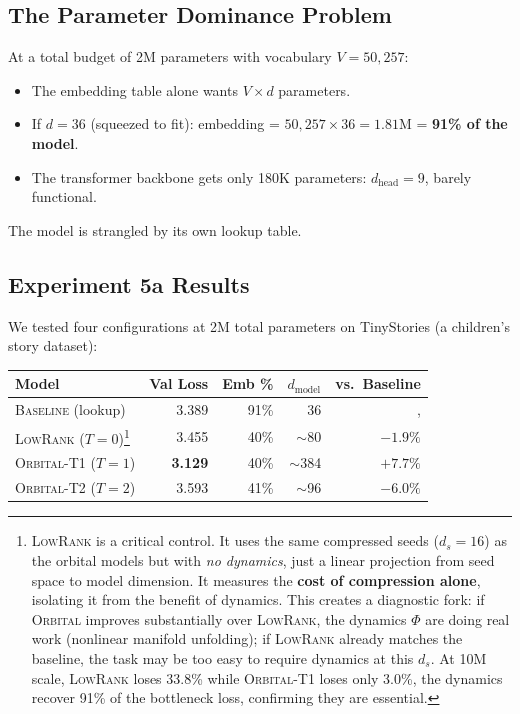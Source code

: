 \documentclass[11pt, a4paper]{article}
\theoremstyle{remark}
\begin{document}
\subsection{The Parameter Dominance Problem}

At a total budget of 2M parameters with vocabulary $V = 50{,}257$:
\begin{itemize}[nosep]
    \item The embedding table alone wants $V \times d$ parameters.
    \item If $d = 36$ (squeezed to fit): embedding = $50{,}257 \times 36 = 1.81$M = \textbf{91\% of the model}.
    \item The transformer backbone gets only 180K parameters: $d_{\text{head}} = 9$, barely functional.
\end{itemize}
The model is strangled by its own lookup table.

\subsection{Experiment 5a Results}

We tested four configurations at 2M total parameters on TinyStories (a children's story dataset):

\begin{center}\small
\begin{tabular}{@{}lrrrr@{}}
\toprule
\textbf{Model} & \textbf{Val Loss} & \textbf{Emb \%} & $d_{\text{model}}$ & \textbf{vs.\ Baseline} \\
\midrule
\textsc{Baseline} (lookup) & 3.389 & 91\% & 36 & ,  \\
\textsc{LowRank} ($T{=}0$)\footnote{%
\textsc{LowRank} is a critical control.
It uses the same compressed seeds ($d_s{=}16$) as the orbital models but with \emph{no dynamics}, just a linear projection from seed space to model dimension.
It measures the \textbf{cost of compression alone}, isolating it from the benefit of dynamics.
This creates a diagnostic fork:
if \textsc{Orbital} improves substantially over \textsc{LowRank}, the dynamics $\Phi$ are doing real work (nonlinear manifold unfolding);
if \textsc{LowRank} already matches the baseline, the task may be too easy to require dynamics at this $d_s$.
At 10M scale, \textsc{LowRank} loses 33.8\% while \textsc{Orbital-T1} loses only 3.0\%, the dynamics recover 91\% of the bottleneck loss, confirming they are essential.%
} & 3.455 & 40\% & $\sim$80 & $-1.9\%$ \\
\textsc{Orbital-T1} ($T{=}1$) & \textbf{3.129} & 40\% & $\sim$384 & $\mathbf{+7.7\%}$ \\
\textsc{Orbital-T2} ($T{=}2$) & 3.593 & 41\% & $\sim$96 & $-6.0\%$ \\
\bottomrule
\end{tabular}
\end{center}
\end{document}
